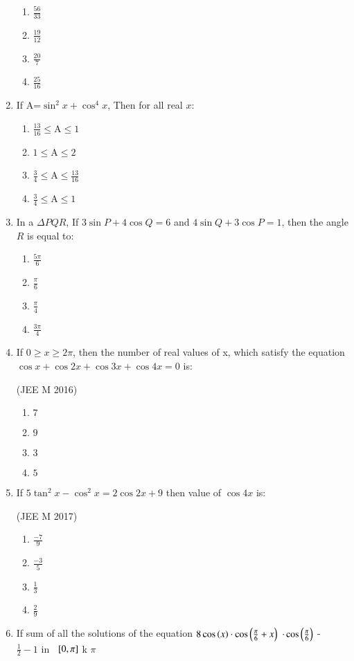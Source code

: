 \begin{enumerate}[label=\thesubsection.\arabic*,ref=\thesubsection.\theenumi]
\begin{multicols}{4}
\begin{enumerate}
\item $\frac{56}{33}$
\columnbreak
\item $\frac{19}{12}$
\columnbreak
\item $\frac{20}{7}$
\columnbreak
\item $\frac{25}{16}$
\end{enumerate} 
\end{multicols}
\item If A=$\sin^2x +\cos^4 x$, Then for all real $x$:
\hfill{}
\begin{multicols}{2} 
\begin{enumerate}
\item $\frac{13}{16}\le$A$\le1$
\item $1\le$A$\le2$
\columnbreak
\item $\frac{3}{4}\le$A$\le\frac{13}{16}$
\item $\frac{3}{4}\le$A$\le1$
\end{enumerate} 
\end{multicols}
\item In a ${\Delta PQR}$, If $3 \sin {P} + 4 \cos {Q}=6$ and $4\sin {Q}+3\cos {P}=1$, then the angle ${R}$ is equal to:
\hfill{}
\begin{multicols}{4}
\begin{enumerate}
\item $\frac{5\pi}{6}$
\columnbreak
\item $\frac{\pi}{6}$
\columnbreak
\item $\frac{\pi}{4}$
\columnbreak
\item $\frac{3\pi}{4}$
\end{enumerate} 
\end{multicols}
\item If $0 \ge x \ge 2\pi$, then the number of real values of x, which   satisfy the equation $\cos x+\cos2x+\cos3x+\cos4x=0$ is:

\hfill {(JEE M 2016)}
    \begin{enumerate}
    \item $7$
    \item $9$
    \item $3$
    \item $5$
    \end{enumerate}
    
\item If $5${$\tan^2x-\cos^2x=2\cos2x+9$} then value of $\cos 4x$ is:

\hfill{(JEE M 2017)}
    \begin{enumerate}
    \item $\frac{-7}{9}$ 
    \item $\frac{-3}{5}$
    \item $\frac{1}{3}$
    \item $\frac{2}{9}$
    \end{enumerate}
 \item If sum of all the solutions of the equation
  $8 \cos\left(x\right) \cdot \cos\left(\frac{\pi}{6} + x \right)$ $\cdot \cos \left(\frac{\pi}{6}\right)$ - $\frac{1}{2} - 1 \text{ in }$ ${}\left[0, \pi\right]$ k $\pi$


\end{enumerate}
